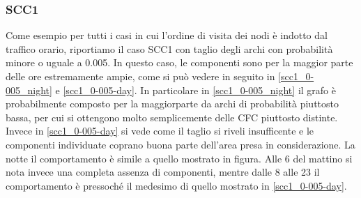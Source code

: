 \documentclass[10pt,a4paper]{article}
\begin{document}
\subsubsection{SCC1}\label{scc1_0-005}
Come esempio per tutti i casi in cui l'ordine di visita dei nodi è indotto dal traffico orario, riportiamo il caso SCC1 con taglio degli archi con probabilità minore o uguale a 0.005.
In questo caso, le componenti sono per la maggior parte delle ore estremamente ampie, come si può vedere in seguito in \ref{scc1_0-005_night} \label{list:scc1_0-005} e \ref{scc1_0-005-day}. 
In particolare in \ref{scc1_0-005_night} il grafo è probabilmente composto per la maggiorparte da archi di probabilità piuttosto bassa, per cui si ottengono molto semplicemente delle CFC piuttosto distinte. Invece in \ref{scc1_0-005-day} si vede come il taglio si riveli insufficente e le componenti individuate coprano buona parte dell'area presa in considerazione. La notte il comportamento è simile a quello mostrato in figura. Alle 6 del mattino si nota invece una completa assenza di componenti, mentre dalle 8 alle 23 il comportamento è pressoché il medesimo di quello mostrato in \ref{scc1_0-005-day}.
\end{document}
